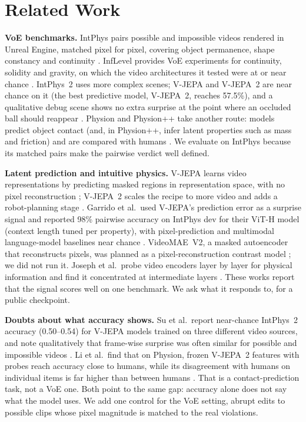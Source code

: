 \section{Related Work}
\label{sec:related}
\textbf{VoE benchmarks.} IntPhys pairs possible and impossible videos rendered in Unreal Engine, matched pixel for pixel, covering object permanence, shape constancy and continuity \cite{riochet2022}. InfLevel provides VoE experiments for continuity, solidity and gravity, on which the video architectures it tested were at or near chance \cite{weihs2022}. IntPhys~2 uses more complex scenes; V-JEPA and V-JEPA~2 are near chance on it (the best predictive model, V-JEPA~2, reaches 57.5\%), and a qualitative debug scene shows no extra surprise at the point where an occluded ball should reappear \cite{bordes2025}. Physion and Physion++ take another route: models predict object contact (and, in Physion++, infer latent properties such as mass and friction) and are compared with humans \cite{bear2021,tung2023}. We evaluate on IntPhys because its matched pairs make the pairwise verdict well defined.

\textbf{Latent prediction and intuitive physics.} V-JEPA learns video representations by predicting masked regions in representation space, with no pixel reconstruction \cite{bardes2024}; V-JEPA~2 scales the recipe to more video and adds a robot-planning stage \cite{assran2025}. Garrido et al.\ used V-JEPA's prediction error as a surprise signal and reported 98\% pairwise accuracy on IntPhys dev for their ViT-H model (context length tuned per property), with pixel-prediction and multimodal language-model baselines near chance \cite{garrido2025}. VideoMAE~V2, a masked autoencoder that reconstructs pixels, was planned as a pixel-reconstruction contrast model \cite{wang2023}; we did not run it. Joseph et al.\ probe video encoders layer by layer for physical information and find it concentrated at intermediate layers \cite{joseph2026}. These works report that the signal scores well on one benchmark. We ask what it responds to, for a public checkpoint.

\textbf{Doubts about what accuracy shows.} Su et al.\ report near-chance IntPhys~2 accuracy (0.50--0.54) for V-JEPA models trained on three different video sources, and note qualitatively that frame-wise surprise was often similar for possible and impossible videos \cite{su2025}. Li et al.\ find that on Physion, frozen V-JEPA~2 features with probes reach accuracy close to humans, while its disagreement with humans on individual items is far higher than between humans \cite{li2026}. That is a contact-prediction task, not a VoE one. Both point to the same gap: accuracy alone does not say what the model uses. We add one control for the VoE setting, abrupt edits to possible clips whose pixel magnitude is matched to the real violations.

